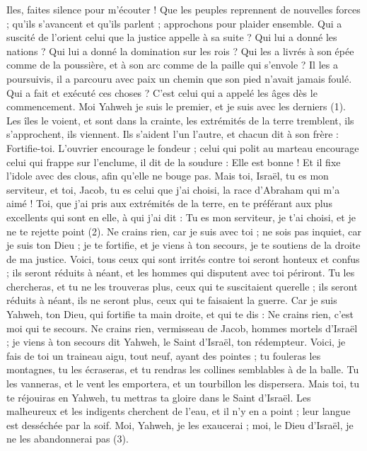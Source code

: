 \begin{multicols}{2}
\VerseOne{}Iles, faites silence pour m’écouter ! Que les peuples reprennent de nouvelles forces ; qu'ils s’avancent et qu’ils parlent ; approchons pour plaider ensemble.
Qui a suscité de l’orient celui que la justice appelle à sa suite ? Qui lui a donné les nations ? Qui lui a donné la domination sur les rois ? Qui les a livrés à son épée comme de la poussière, et à son arc comme de la paille qui s’envole ?
Il les a poursuivis, il a parcouru avec paix un chemin que son pied n’avait jamais foulé.
Qui a fait et exécuté ces choses ? C’est celui qui a appelé les âges dès le commencement. Moi Yahweh je suis le premier, et je suis avec les derniers (1).
Les îles le voient, et sont dans la crainte, les extrémités de la terre tremblent, ils s’approchent, ils viennent.
Ils s’aident l’un l’autre, et chacun dit à son frère : Fortifie-toi.
L'ouvrier encourage le fondeur ; celui qui polit au marteau encourage celui qui frappe sur l'enclume, il dit de la soudure : Elle est bonne ! Et il fixe l’idole avec des clous, afin qu’elle ne bouge pas.
Mais toi, Israël, tu es mon serviteur, et toi, Jacob, tu es celui que j'ai choisi, la race d'Abraham qui m'a aimé !
Toi, que j’ai pris aux extrémités de la terre, en te préférant aux plus excellents qui sont en elle, à qui j’ai dit : Tu es mon serviteur, je t'ai choisi, et je ne te rejette point (2).
Ne crains rien, car je suis avec toi ; ne sois pas inquiet, car je suis ton Dieu ; je te fortifie, et je viens à ton secours, je te soutiens de la droite de ma justice.
Voici, tous ceux qui sont irrités contre toi seront honteux et confus ; ils seront réduits à néant, et les hommes qui disputent avec toi périront.
Tu les chercheras, et tu ne les trouveras plus, ceux qui te suscitaient querelle ; ils seront réduits à néant, ils ne seront plus, ceux qui te faisaient la guerre.
Car je suis Yahweh, ton Dieu, qui fortifie ta main droite, et qui te dis : Ne crains rien, c'est moi qui te secours.
Ne crains rien, vermisseau de Jacob, hommes mortels d'Israël ; je viens à ton secours dit Yahweh, le Saint d'Israël, ton rédempteur.
Voici, je fais de toi un traineau aigu, tout neuf, ayant des pointes ; tu fouleras les montagnes, tu les écraseras, et tu rendras les collines semblables à de la balle.
Tu les vanneras, et le vent les emportera, et un tourbillon les dispersera. Mais toi, tu te réjouiras en Yahweh, tu mettras ta gloire dans le Saint d'Israël.
Les malheureux et les indigents cherchent de l’eau, et il n’y en a point ; leur langue est desséchée par la soif. Moi, Yahweh, je les exaucerai ; moi, le Dieu d'Israël, je ne les abandonnerai pas (3).

\end{multicols}
